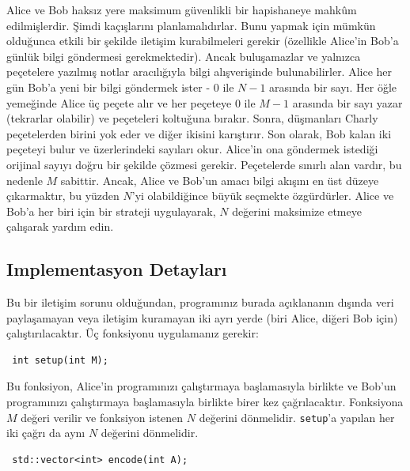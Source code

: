\documentclass[12pt]{article}
\begin{document}
\renewcommand{\round}{Gün 1}
\renewcommand{\problemName}{Görev Hapis (Task Prison)}
\renewcommand{\lang}{Türkçe}

\renewcommand{\tl}{$2$ saniye}
\renewcommand{\ml}{$1024$ MB}
\problem{\problemName}

Alice ve Bob haksız yere maksimum güvenlikli bir hapishaneye mahkûm edilmişlerdir. Şimdi kaçışlarını planlamalıdırlar. Bunu yapmak için mümkün olduğunca etkili bir şekilde iletişim kurabilmeleri gerekir (özellikle Alice'in Bob'a günlük bilgi göndermesi gerekmektedir). Ancak buluşamazlar ve yalnızca peçetelere yazılmış notlar aracılığıyla bilgi alışverişinde bulunabilirler. Alice her gün Bob'a yeni bir bilgi göndermek ister - $0$ ile $N-1$ arasında bir sayı. Her öğle yemeğinde Alice üç peçete alır ve her peçeteye $0$ ile $M-1$ arasında bir sayı yazar (tekrarlar olabilir) ve peçeteleri koltuğuna bırakır. Sonra, düşmanları Charly peçetelerden birini yok eder ve diğer ikisini karıştırır. Son olarak, Bob kalan iki peçeteyi bulur ve üzerlerindeki sayıları okur. Alice'in ona göndermek istediği orijinal sayıyı doğru bir şekilde çözmesi gerekir. Peçetelerde sınırlı alan vardır, bu nedenle $M$ sabittir. Ancak, Alice ve Bob'un amacı bilgi akışını en üst düzeye çıkarmaktır, bu yüzden $N$'yi olabildiğince büyük seçmekte özgürdürler. Alice ve Bob'a her biri için bir strateji uygulayarak, $N$ değerini maksimize etmeye çalışarak yardım edin.


\subsection{Implementasyon Detayları}
Bu bir iletişim sorunu olduğundan, programınız burada açıklananın dışında veri paylaşamayan veya iletişim kuramayan iki ayrı yerde (biri Alice, diğeri Bob için) çalıştırılacaktır. Üç fonksiyonu uygulamanız gerekir:


\begin{lstlisting}
 int setup(int M);
\end{lstlisting}

Bu fonksiyon, Alice'in programınızı çalıştırmaya başlamasıyla birlikte ve Bob'un programınızı çalıştırmaya başlamasıyla birlikte birer kez çağrılacaktır. Fonksiyona $M$ değeri verilir ve fonksiyon istenen $N$ değerini dönmelidir. \texttt{setup}'a yapılan her iki çağrı da aynı $N$ değerini dönmelidir.


\begin{lstlisting}
 std::vector<int> encode(int A);
\end{lstlisting}
\end{document}
